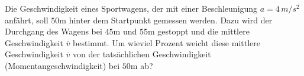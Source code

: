 \begin{ExerciseBlock}
Die Geschwindigkeit eines Sportwagens, der mit einer Beschleunigung $a = 4 \, m/s^2$ anfährt, soll $50$m hinter dem Startpunkt gemessen werden. Dazu wird der Durchgang des Wagens bei $45$m und $55$m gestoppt und die mittlere Geschwindigkeit $\bar{v}$ bestimmt. Um wieviel Prozent weicht diese mittlere Geschwindigkeit $\bar{v}$ von der tatsächlichen Geschwindigkeit (Momentangeschwindigkeit) bei $50$m ab?
\end{ExerciseBlock}
